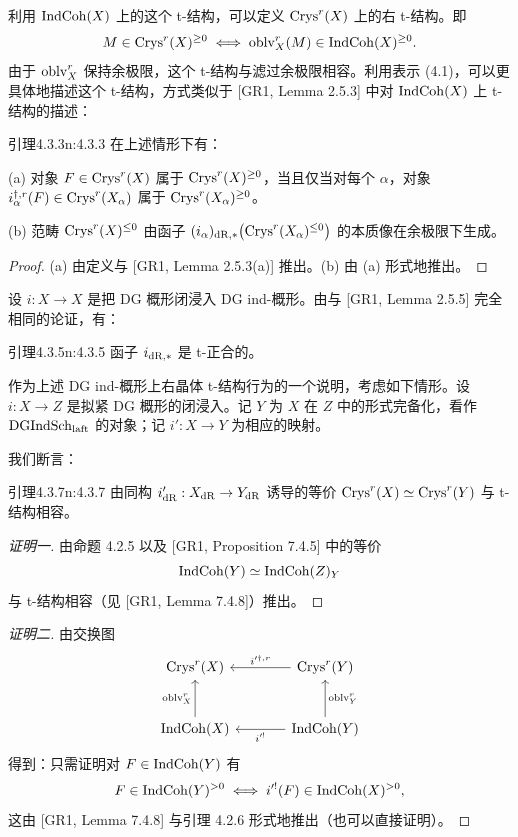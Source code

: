 利用 $\mathrm{IndCoh}(X)$ 上的这个 t-结构，可以定义 $\mathrm{Crys}^r(X)$ 上的右 t-结构。即
\[
M\in\mathrm{Crys}^r(X)^{\geq 0}\iff \mathrm{oblv}^r_X(M)\in\mathrm{IndCoh}(X)^{\geq 0}.
\]
由于 $\mathrm{oblv}^r_X$ 保持余极限，这个 t-结构与滤过余极限相容。利用表示 (4.1)，可以更具体地描述这个 t-结构，方式类似于 [GR1, Lemma 2.5.3] 中对 $\mathrm{IndCoh}(X)$ 上 t-结构的描述：

\begin{othm}{引理}{4.3.3}{n:4.3.3}
在上述情形下有：

(a) 对象 $F\in\mathrm{Crys}^r(X)$ 属于 $\mathrm{Crys}^r(X)^{\geq 0}$，当且仅当对每个 $\alpha$，对象 $i^{\dagger,r}_\alpha(F)\in\mathrm{Crys}^r(X_\alpha)$ 属于 $\mathrm{Crys}^r(X_\alpha)^{\geq 0}$。

(b) 范畴 $\mathrm{Crys}^r(X)^{\leq 0}$ 由函子 $(i_\alpha)_{\mathrm{dR},*}\big(\mathrm{Crys}^r(X_\alpha)^{\leq 0}\big)$ 的本质像在余极限下生成。
\end{othm}

\begin{proof}
(a) 由定义与 [GR1, Lemma 2.5.3(a)] 推出。(b) 由 (a) 形式地推出。
\end{proof}

设 $i:X\to X$ 是把 DG 概形闭浸入 DG ind-概形。由与 [GR1, Lemma 2.5.5] 完全相同的论证，有：

\begin{othm}{引理}{4.3.5}{n:4.3.5}
函子 $i_{\mathrm{dR},*}$ 是 t-正合的。
\end{othm}
作为上述 DG ind-概形上右晶体 t-结构行为的一个说明，考虑如下情形。设 $i:X\to Z$ 是拟紧 DG 概形的闭浸入。记 $Y$ 为 $X$ 在 $Z$ 中的形式完备化，看作 $\mathrm{DGIndSch}_{\mathrm{laft}}$ 的对象；记 $i':X\to Y$ 为相应的映射。

我们断言：

\begin{othm}{引理}{4.3.7}{n:4.3.7}
由同构 $i'_{\mathrm{dR}}:X_{\mathrm{dR}}\to Y_{\mathrm{dR}}$ 诱导的等价 $\mathrm{Crys}^r(X)\simeq\mathrm{Crys}^r(Y)$ 与 t-结构相容。
\end{othm}

\begin{proof}[证明一]
由命题 4.2.5 以及 [GR1, Proposition 7.4.5] 中的等价
\[
\mathrm{IndCoh}(Y)\simeq\mathrm{IndCoh}(Z)_Y
\]
与 t-结构相容（见 [GR1, Lemma 7.4.8]）推出。
\end{proof}

\begin{proof}[证明二]
由交换图
\[
\begin{tikzcd}[column sep=large, row sep=large]
 \Crys^r(X) & \Crys^r(Y) \arrow[l, "i'^{\dagger,r}"'] \\
 \IndCoh(X) \arrow[u, "\oblv^r_X"] & \IndCoh(Y) \arrow[l, "i'^!"] \arrow[u, "\oblv^r_Y"']
\end{tikzcd}
\]
得到：只需证明对 $F\in\mathrm{IndCoh}(Y)$ 有
\[
F\in\mathrm{IndCoh}(Y)^{>0}\iff i'^!(F)\in\mathrm{IndCoh}(X)^{>0},
\]
这由 [GR1, Lemma 7.4.8] 与引理 4.2.6 形式地推出（也可以直接证明）。
\end{proof}


